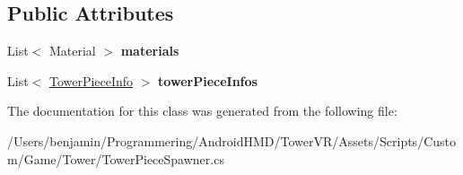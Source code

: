 \subsection*{Public Attributes}
\begin{DoxyCompactItemize}
\item 
List$<$ Material $>$ {\bfseries materials}\hypertarget{class_tower_v_r_1_1_tower_piece_spawner_a61ce0fc19fb1800a95cb74efc7a7ab6f}{}\label{class_tower_v_r_1_1_tower_piece_spawner_a61ce0fc19fb1800a95cb74efc7a7ab6f}

\item 
List$<$ \hyperlink{class_tower_v_r_1_1_tower_piece_info}{Tower\+Piece\+Info} $>$ {\bfseries tower\+Piece\+Infos}\hypertarget{class_tower_v_r_1_1_tower_piece_spawner_a2ce360a9da394be0169dac4f2bf4ca2d}{}\label{class_tower_v_r_1_1_tower_piece_spawner_a2ce360a9da394be0169dac4f2bf4ca2d}

\end{DoxyCompactItemize}


The documentation for this class was generated from the following file\+:\begin{DoxyCompactItemize}
\item 
/\+Users/benjamin/\+Programmering/\+Android\+H\+M\+D/\+Tower\+V\+R/\+Assets/\+Scripts/\+Custom/\+Game/\+Tower/Tower\+Piece\+Spawner.\+cs\end{DoxyCompactItemize}
